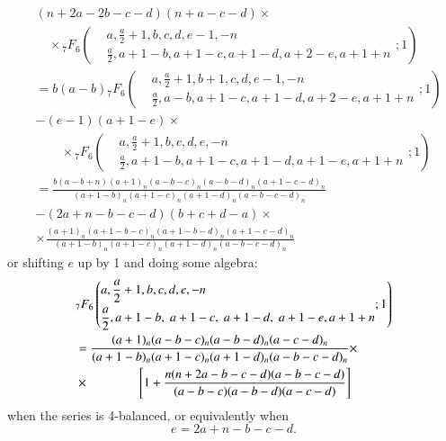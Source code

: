 \begin{align*}
& (n+2 a - 2 b - c -d) (n+a - c -d) \times \\
& \quad \times  {}_7 F_6 \left(\begin{aligned} 
&a, \frac{a}{2} + 1, b, c, d, e -1, -n\\
&\frac{a}{2}, a+1 - b, a + 1-c, a+1 -d, a+2 - e, a +1 + n
\end{aligned};1 \right)\\
& = b (a-b) {}_7 F_6
\left(\begin{aligned}
& a, \frac{a}{2} + 1, b+1, c, d, e-1, -n\\
& \frac{a}{2}, a-b, a+1 - c, a + 1-d, a+2 -e, a+ 1 + n
\end{aligned} ; 1\right)\\
& - (e-1) (a+1-e) \times \\
& \qquad \times {}_7 F_6 
\left(\begin{aligned}
& a, \frac{a}{2} + 1, b, c, d, e, -n\\
& \frac{a}{2}, a+ 1- b, a+1 - c, a +1 - d, a+1 - e, a + 1 + n
\end{aligned} ;1\right)\\
& = \frac{b(a-b+n) (a+1)_n (a-b-c)_n (a-b-d)_n (a+1-c-d)_n}{(a+1-b)_n (a+1-c)_n (a+1-d)_n (a-b-c-d)_n}\\
& - (2a + n - b - c -d) (b+c + d -a) \times \\
& \times \frac{(a+1)_n (a+ 1 - b - c)_n (a+ 1 - b -d)_n (a+ 1 - c -d)_n}{(a+1-b)_n (a+1-c)_n (a+1-d)_n(a-b-c-d)_n}
\end{align*}\pageoriginale
or shifting $e$ up by 1 and doing some algebra:
\begin{align}
& {}_7F_6 \left(\begin{aligned}
& a, \frac{a}{2} + 1, b, c, d, e, -n\\
& \frac{a}{2}, a+ 1 - b, \; a + 1 -c, \; a+ 1 - d,\; a+ 1 - e, a+ 1+ n
\end{aligned} ; 1\right)\label{art1-eq2.3}\\
& = \frac{(a+1)_n (a-b-c)_n (a-b-d)_n(a-c-d)_n}{(a+1-b)_n (a+1-c)_n(a+1-d)_n (a-b-c-d)_n} \times \notag\\
& \times \qquad \qquad \left[1+ \frac{n (n+2a-b-c-d) (a-b-c-d)}{(a-b-c) (a-b-d)(a-c-d)} \right] \notag
\end{align}
when the series is 4-balanced, or equivalently when
\begin{equation}
e = 2 a + n - b - c -d.  \label{art1-eq2.4}
\end{equation}


